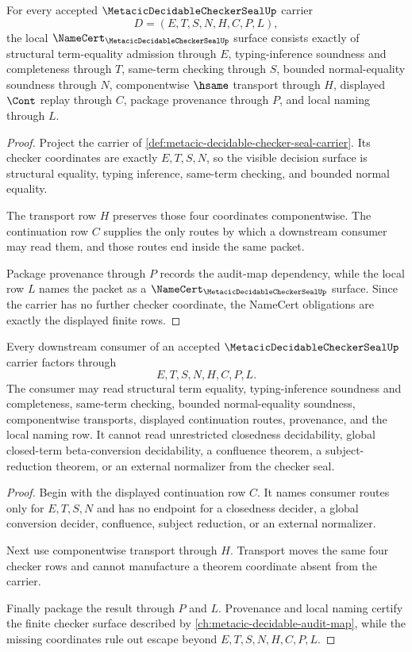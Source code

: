 \begin{theorem}
\label{thm:metacic-decidable-checker-seal-namecert-obligations}
For every accepted $\MetacicDecidableCheckerSealUp$ carrier
$$
D=(E,T,S,N,H,C,P,L),
$$
the local $\NameCert_{\MetacicDecidableCheckerSealUp}$ surface consists exactly of structural term-equality admission through $E$, typing-inference soundness and completeness through $T$, same-term checking through $S$, bounded normal-equality soundness through $N$, componentwise $\hsame$ transport through $H$, displayed $\Cont$ replay through $C$, package provenance through $P$, and local naming through $L$.
\end{theorem}
\begin{proof}
Project the carrier of \autoref{def:metacic-decidable-checker-seal-carrier}. Its checker coordinates are exactly $E,T,S,N$, so the visible decision surface is structural equality, typing inference, same-term checking, and bounded normal equality.

The transport row $H$ preserves those four coordinates componentwise. The continuation row $C$ supplies the only routes by which a downstream consumer may read them, and those routes end inside the same packet.

Package provenance through $P$ records the audit-map dependency, while the local row $L$ names the packet as a $\NameCert_{\MetacicDecidableCheckerSealUp}$ surface. Since the carrier has no further checker coordinate, the NameCert obligations are exactly the displayed finite rows.
\end{proof}

\begin{theorem}
\label{thm:metacic-decidable-checker-seal-non-escape}
Every downstream consumer of an accepted $\MetacicDecidableCheckerSealUp$ carrier factors through
$$
E,T,S,N,H,C,P,L.
$$
The consumer may read structural term equality, typing-inference soundness and completeness, same-term checking, bounded normal-equality soundness, componentwise transports, displayed continuation routes, provenance, and the local naming row. It cannot read unrestricted closedness decidability, global closed-term beta-conversion decidability, a confluence theorem, a subject-reduction theorem, or an external normalizer from the checker seal.
\end{theorem}
\begin{proof}
Begin with the displayed continuation row $C$. It names consumer routes only for $E,T,S,N$ and has no endpoint for a closedness decider, a global conversion decider, confluence, subject reduction, or an external normalizer.

Next use componentwise transport through $H$. Transport moves the same four checker rows and cannot manufacture a theorem coordinate absent from the carrier.

Finally package the result through $P$ and $L$. Provenance and local naming certify the finite checker surface described by \autoref{ch:metacic-decidable-audit-map}, while the missing coordinates rule out escape beyond $E,T,S,N,H,C,P,L$.
\end{proof}

